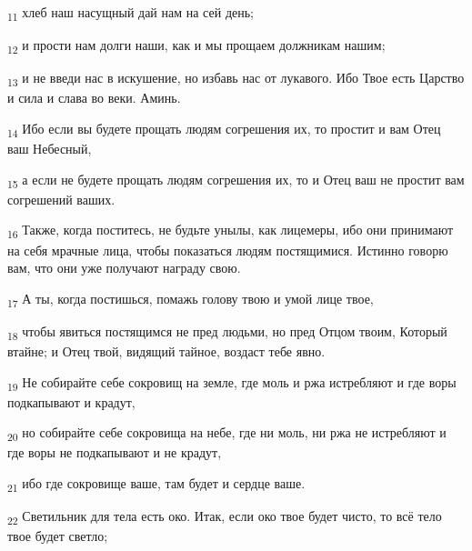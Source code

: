 \begin{tcolorbox}
\textsubscript{11} хлеб наш насущный дай нам на сей день;
\end{tcolorbox}
\begin{tcolorbox}
\textsubscript{12} и прости нам долги наши, как и мы прощаем должникам нашим;
\end{tcolorbox}
\begin{tcolorbox}
\textsubscript{13} и не введи нас в искушение, но избавь нас от лукавого. Ибо Твое есть Царство и сила и слава во веки. Аминь.
\end{tcolorbox}
\begin{tcolorbox}
\textsubscript{14} Ибо если вы будете прощать людям согрешения их, то простит и вам Отец ваш Небесный,
\end{tcolorbox}
\begin{tcolorbox}
\textsubscript{15} а если не будете прощать людям согрешения их, то и Отец ваш не простит вам согрешений ваших.
\end{tcolorbox}
\begin{tcolorbox}
\textsubscript{16} Также, когда поститесь, не будьте унылы, как лицемеры, ибо они принимают на себя мрачные лица, чтобы показаться людям постящимися. Истинно говорю вам, что они уже получают награду свою.
\end{tcolorbox}
\begin{tcolorbox}
\textsubscript{17} А ты, когда постишься, помажь голову твою и умой лице твое,
\end{tcolorbox}
\begin{tcolorbox}
\textsubscript{18} чтобы явиться постящимся не пред людьми, но пред Отцом твоим, Который втайне; и Отец твой, видящий тайное, воздаст тебе явно.
\end{tcolorbox}
\begin{tcolorbox}
\textsubscript{19} Не собирайте себе сокровищ на земле, где моль и ржа истребляют и где воры подкапывают и крадут,
\end{tcolorbox}
\begin{tcolorbox}
\textsubscript{20} но собирайте себе сокровища на небе, где ни моль, ни ржа не истребляют и где воры не подкапывают и не крадут,
\end{tcolorbox}
\begin{tcolorbox}
\textsubscript{21} ибо где сокровище ваше, там будет и сердце ваше.
\end{tcolorbox}
\begin{tcolorbox}
\textsubscript{22} Светильник для тела есть око. Итак, если око твое будет чисто, то всё тело твое будет светло;
\end{tcolorbox}

